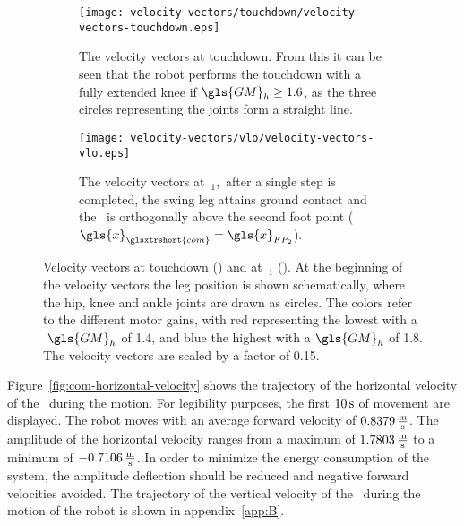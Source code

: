\begin{figure}[H]%
    \centering%
    \begin{subfigure}[t]{0.8\linewidth}%
        \centering%
        \texttt{[image: velocity-vectors/touchdown/velocity-vectors-touchdown.eps]}
        \caption{The velocity vectors at touchdown. From this it can be seen that the robot performs the touchdown with a fully extended knee if$~\gls{GM}_h \geq 1.6$, as the three circles representing the joints form a straight line.}%
        \label{fig:velocity-vectors-touchdown}%
        \vspace*{2mm}%
    \end{subfigure}%
    \vfil%
    \centering%
    \begin{subfigure}[b]{0.8\linewidth}%
        \centering%
        \texttt{[image: velocity-vectors/vlo/velocity-vectors-vlo.eps]}
        \caption{The velocity vectors at~$_{1}$,~\ie after a single step is completed, the swing leg attains ground contact and the~ is orthogonally above the second foot point ($\gls{x}_{\glsxtrshort{com}} = \gls{x}_{FP_2}$).}%
        \label{fig:velocity-vectors-vlo}%
    \end{subfigure}%
    \caption{Velocity vectors at touchdown () and at~$_{1}$ (). At the beginning of the velocity vectors the leg position is shown schematically, where the hip, knee and ankle joints are drawn as circles. The colors refer to the different motor gains, with red representing the lowest with a$~\gls{GM}_h$ of 1.4, and blue the highest with a$~\gls{GM}_h$ of 1.8. The velocity vectors are scaled by a factor of 0.15.}%
    \label{fig:velocity-vectors}%
\end{figure}

Figure~\ref{fig:com-horizontal-velocity} shows the trajectory of the horizontal velocity of the~ during the motion. For legibility purposes, the first $10\,\textrm{\si{\second}}$ of movement are displayed. The robot moves with an average forward velocity of $0.8379\,\textrm{\si{\metre\per\second}}$. The amplitude of the horizontal velocity ranges from a maximum of $1.7803\,\textrm{\si{\metre\per\second}}$ to a minimum of $-0.7106\,\textrm{\si{\metre\per\second}}$. In order to minimize the energy consumption of the system, the amplitude deflection should be reduced and negative forward velocities avoided. The trajectory of the vertical velocity of the~ during the motion of the robot is shown in appendix~\ref{app:B}.

